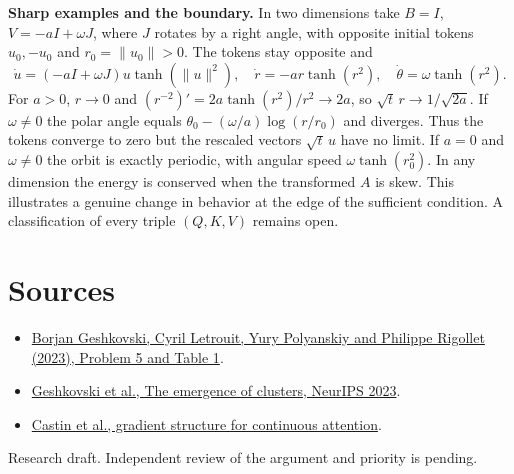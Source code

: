 \documentclass[10pt]{article}
\begin{document}
\textbf{Sharp examples and the boundary.} In two dimensions take $B=I$, $V=-aI+\omega J$, where $J$ rotates by a right angle, with opposite initial tokens $u_0,-u_0$ and $r_0=\|u_0\|>0$. The tokens stay opposite and
\[
 \dot u=(-aI+\omega J)u\tanh(\|u\|^2),\quad
 \dot r=-ar\tanh(r^2),\quad\dot\theta=\omega\tanh(r^2).
\]
For $a>0$, $r\to0$ and $(r^{-2})'=2a\tanh(r^2)/r^2\to2a$, so $\sqrt t\,r\to1/\sqrt{2a}$. If $\omega\ne0$ the polar angle equals $\theta_0-(\omega/a)\log(r/r_0)$ and diverges. Thus the tokens converge to zero but the rescaled vectors $\sqrt t\,u$ have no limit. If $a=0$ and $\omega\ne0$ the orbit is exactly periodic, with angular speed $\omega\tanh(r_0^2)$. In any dimension the energy is conserved when the transformed $A$ is skew. This illustrates a genuine change in behavior at the edge of the sufficient condition. A classification of every triple $(Q,K,V)$ remains open.

\section*{Sources}
\begin{itemize}
\item \href{https://arxiv.org/abs/2312.10794}{Borjan Geshkovski, Cyril Letrouit, Yury Polyanskiy and Philippe Rigollet (2023), Problem 5 and Table 1}.
\item \href{https://papers.neurips.cc/paper_files/paper/2023/file/b2b3e1d9840eba17ad9bbf073e009afe-Paper-Conference.pdf}{Geshkovski et al., The emergence of clusters, NeurIPS 2023}.
\item \href{https://arxiv.org/abs/2501.18322}{Castin et al., gradient structure for continuous attention}.
\end{itemize}
{\small Research draft. Independent review of the argument and priority is pending.}
\end{document}
